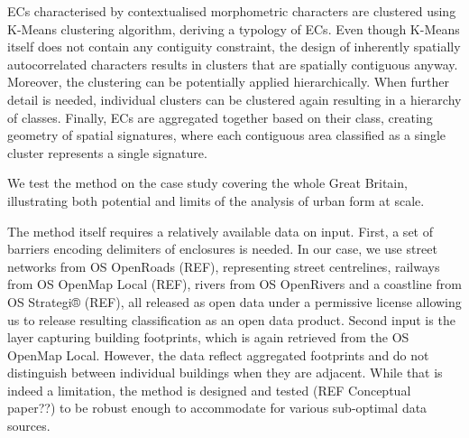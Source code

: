 ECs characterised by contextualised morphometric characters are clustered using K-Means
clustering algorithm, deriving a typology of ECs. Even though K-Means itself does not
contain any contiguity constraint, the design of inherently spatially autocorrelated
characters results in clusters that are spatially contiguous anyway. Moreover, the clustering can
be potentially applied hierarchically. When further detail is needed, individual
clusters can be clustered again resulting in a hierarchy of classes. Finally, ECs are
aggregated together based on their class, creating geometry of spatial signatures, where
each contiguous area classified as a single cluster represents a single signature.

We test the method on the case study covering the whole Great Britain, illustrating both
potential and limits of the analysis of urban form at scale.

The method itself requires a relatively available data on input. First, a set of
barriers encoding delimiters of enclosures is needed. In our case, we use street
networks from OS OpenRoads (REF), representing street centrelines, railways from OS
OpenMap Local (REF), rivers from OS OpenRivers and a coastline from OS Strategi® (REF),
all released as open data under a permissive license allowing us to release
resulting classification as an open data product. Second input is the layer capturing
building footprints, which is again retrieved from the OS OpenMap Local. However, the
data reflect aggregated footprints and do not distinguish between individual buildings
when they are adjacent. While that is indeed a limitation, the method is designed and
tested (REF Conceptual paper??) to be robust enough to accommodate for various
sub-optimal data sources.
